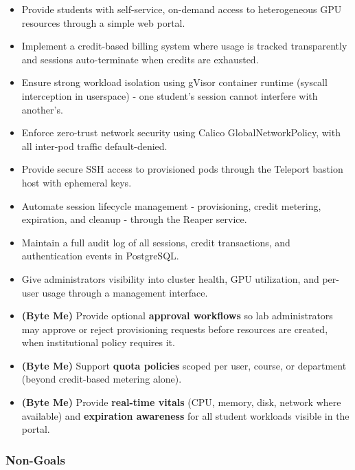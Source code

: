 \documentclass[12pt,a4paper]{article}
\begin{document}
\begin{itemize}[leftmargin=1.5em]
  \item Provide students with self-service, on-demand access to heterogeneous GPU resources through a simple web portal.
  \item Implement a credit-based billing system where usage is tracked transparently and sessions auto-terminate when credits are exhausted.
  \item Ensure strong workload isolation using gVisor container runtime (syscall interception in userspace) - one student's session cannot interfere with another's.
  \item Enforce zero-trust network security using Calico GlobalNetworkPolicy, with all inter-pod traffic default-denied.
  \item Provide secure SSH access to provisioned pods through the Teleport bastion host with ephemeral keys.
  \item Automate session lifecycle management - provisioning, credit metering, expiration, and cleanup - through the Reaper service.
  \item Maintain a full audit log of all sessions, credit transactions, and authentication events in PostgreSQL.
  \item Give administrators visibility into cluster health, GPU utilization, and per-user usage through a management interface.
  \item \textbf{(Byte Me)} Provide optional \textbf{approval workflows} so lab administrators may approve or reject provisioning requests before resources are created, when institutional policy requires it.
  \item \textbf{(Byte Me)} Support \textbf{quota policies} scoped per user, course, or department (beyond credit-based metering alone).
  \item \textbf{(Byte Me)} Provide \textbf{real-time vitals} (CPU, memory, disk, network where available) and \textbf{expiration awareness} for all student workloads visible in the portal.
\end{itemize}

\subsubsection*{Non-Goals}
\end{document}
